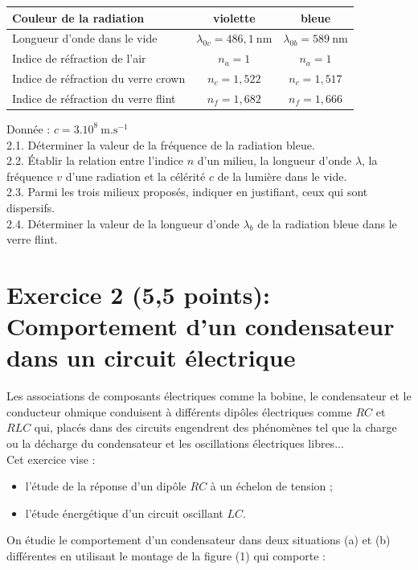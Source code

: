 \begin{center}
\begin{tabular}{|l|c|c|}
\hline
Couleur de la radiation & violette & bleue \\
\hline
Longueur d'onde dans le vide & $\lambda_{0 v}=486,1 \mathrm{~nm}$ & $\lambda_{0 b}=589 \mathrm{~nm}$ \\
\hline
Indice de réfraction de l'air & $n_{a}=1$ & $n_{a}=1$ \\
\hline
Indice de réfraction du verre crown & $n_{c}=1,522$ & $n_{c}=1,517$ \\
\hline
Indice de réfraction du verre flint & $n_{f}=1,682$ & $n_{f}=1,666$ \\
\hline
\end{tabular}
\end{center}

Donnée : $c=3.10^{8} \mathrm{~m} . \mathrm{s}^{-1}$\\
2.1. Déterminer la valeur de la fréquence de la radiation bleue.\\
2.2. Établir la relation entre l'indice $n$ d'un milieu, la longueur d'onde $\lambda$, la fréquence $v$ d'une radiation et la célérité $c$ de la lumière dans le vide.\\
2.3. Parmi les trois milieux proposés, indiquer en justifiant, ceux qui sont dispersifs.\\
2.4. Déterminer la valeur de la longueur d'onde $\lambda_{b}$ de la radiation bleue dans le verre flint.

\section*{Exercice 2 (5,5 points): Comportement d'un condensateur dans un circuit électrique}
Les associations de composants électriques comme la bobine, le condensateur et le conducteur ohmique conduisent à différents dipôles électriques comme $R C$ et $R L C$ qui, placés dans des circuits engendrent des phénomènes tel que la charge ou la décharge du condensateur et les oscillations électriques libres...\\
Cet exercice vise :

\begin{itemize}
  \item l'étude de la réponse d'un dipôle $R C$ à un échelon de tension ;
  \item l'étude énergétique d'un circuit oscillant $L C$.
\end{itemize}

On étudie le comportement d'un condensateur dans deux situations (a) et (b) différentes en utilisant le montage de la figure (1) qui comporte :

